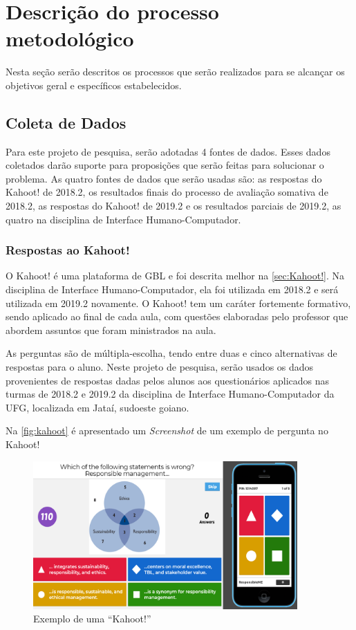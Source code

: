 \documentclass[
	12pt,				%
	openright,			%
	oneside,
	a4paper,			%
	english,			%
	french,				%
	spanish,			%
	brazil,				%
	]{abntex2}
\begin{document}
\section{Descrição do processo metodológico} \label{sec:metodo}

Nesta seção serão descritos os processos que serão realizados para se alcançar os objetivos geral e específicos estabelecidos.

\subsection{Coleta de Dados}
Para este projeto de pesquisa, serão adotadas 4 fontes de dados. Esses dados coletados darão suporte para proposições que serão feitas para solucionar o problema. As quatro fontes de dados que serão usadas são: as respostas do Kahoot! de 2018.2, os resultados finais do processo de avaliação somativa de 2018.2, as respostas do Kahoot! de 2019.2 e os resultados parciais de 2019.2, as quatro na disciplina de Interface Humano-Computador.

\subsubsection{Respostas ao Kahoot!}
O Kahoot! é uma plataforma de GBL e foi descrita melhor na \autoref{sec:Kahoot!}. Na disciplina de Interface Humano-Computador, ela foi utilizada em 2018.2 e será utilizada em 2019.2 novamente. O Kahoot! tem um caráter fortemente formativo, sendo aplicado ao final de cada aula, com questões elaboradas pelo professor que abordem assuntos que foram ministrados na aula. 

As perguntas são de múltipla-escolha, tendo entre duas e cinco alternativas de respostas para o aluno. Neste projeto de pesquisa, serão usados os dados provenientes de respostas dadas pelos alunos aos questionários aplicados nas turmas de 2018.2 e 2019.2 da disciplina de Interface Humano-Computador da UFG, localizada em Jataí, sudoeste goiano.

Na \autoref{fig:kahoot} é apresentado um \textit{Screenshot} de um exemplo de pergunta no Kahoot!

\begin{figure}
    \centering
    \includegraphics[width=0.9\textwidth]{Modelo_Projeto_Pesquisa_UFG_REJ_BCC/KahootScreenshot.png}
    \caption{Exemplo de uma ``Kahoot!''}
    \label{fig:kahoot}
\end{figure}
\end{document}
